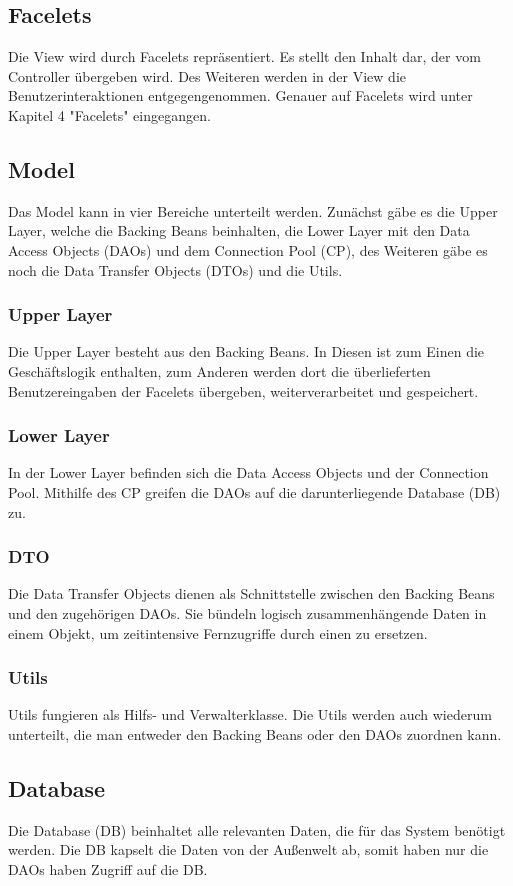     \subsection{Facelets}
    	Die View wird durch Facelets repräsentiert. Es stellt den Inhalt dar, der vom Controller übergeben wird. Des Weiteren werden in der View die Benutzerinteraktionen entgegengenommen. Genauer auf Facelets wird unter Kapitel 4 "Facelets" eingegangen.
   	\subsection{Model}
   	Das Model kann in vier Bereiche unterteilt werden. Zunächst gäbe es die Upper Layer, welche die Backing Beans beinhalten, die Lower Layer mit den Data Access Objects (DAOs) und dem Connection Pool (CP), des Weiteren gäbe es noch die Data Transfer Objects (DTOs) und die Utils. 
   		\subsubsection{Upper Layer}
   		Die \glqq Upper Layer\grqq{} besteht aus den Backing Beans. In Diesen ist zum Einen die Geschäftslogik enthalten, zum Anderen werden dort die überlieferten Benutzereingaben der Facelets übergeben, weiterverarbeitet und gespeichert.
    	\subsubsection{Lower Layer}
    	In der \glqq Lower Layer\grqq{} befinden sich die Data Access Objects und der Connection Pool. Mithilfe des CP greifen die DAOs auf die darunterliegende Database (DB) zu.
    	\subsubsection{DTO}
    	Die Data Transfer Objects dienen als Schnittstelle zwischen den Backing Beans und den zugehörigen DAOs. Sie bündeln logisch zusammenhängende Daten in einem Objekt, um zeitintensive Fernzugriffe durch einen zu ersetzen.
    	\subsubsection{Utils}
    	Utils fungieren als Hilfs- und Verwalterklasse. Die Utils werden auch wiederum unterteilt, die man entweder den Backing Beans oder den DAOs zuordnen kann. 
    \subsection{Database}
    Die Database (DB) beinhaltet alle relevanten Daten, die für das System benötigt werden. Die DB kapselt die Daten von der Außenwelt ab, somit haben nur die DAOs haben Zugriff auf die DB. 
